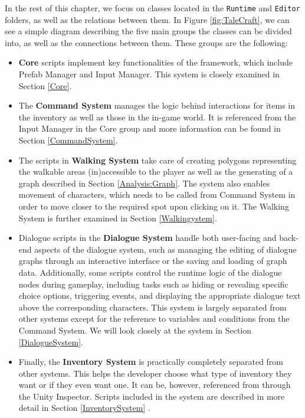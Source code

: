 In the rest of this chapter, we focus on classes located in the \verb|Runtime| and \verb|Editor| folders, as well as the relations between them. In Figure \ref{fig:TaleCraft}, we can see a simple diagram describing the five main groups the classes can be divided into, as well as the connections between them. These groups are the following: 
\begin{itemize}
    \item \textbf{Core} scripts implement key functionalities of the framework, which include Prefab Manager and Input Manager. This system is closely examined in Section \ref{Core}.
    \item The \textbf{Command System} manages the logic behind interactions for items in the inventory as well as those in the in-game world. It is referenced from the Input Manager in the Core group and more information can be found in Section \ref{CommandSystem}.
    \item The scripts in \textbf{Walking System} take care of creating polygons representing the walkable areas (in)accessible to the player as well as the generating of a graph described in Section \ref{Analysis:Graph}. The system also enables movement of characters, which needs to be called from Command System in order to move closer to the required spot upon clicking on it. The Walking System is further examined in Section \ref{Walkingystem}.
    \item  Dialogue scripts in the \textbf{Dialogue System} handle both user-facing and back-end aspects of the dialogue system, such as managing the editing of dialogue graphs through an interactive interface or the saving and loading of graph data. Additionally, some scripts control the runtime logic of the dialogue nodes during gameplay, including tasks such as hiding or revealing specific choice options, triggering events, and displaying the appropriate dialogue text above the corresponding characters. This system is largely separated from other systems except for the reference to variables and conditions from the Command System. We will look closely at the system in Section \ref{DialogueSystem}. 
    \item Finally, the \textbf{Inventory System} is practically completely separated from other systems. This helps the developer choose what type of inventory they want or if they even want one. It can be, however, referenced from through the Unity Inspector. Scripts included in the system are described in more detail in Section \ref{InventorySystem} .
\end{itemize}

